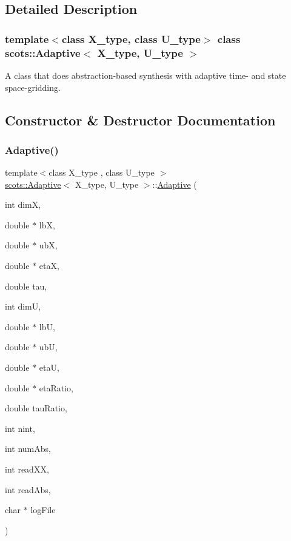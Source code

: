 \subsection{Detailed Description}
\subsubsection*{template$<$class X\+\_\+type, class U\+\_\+type$>$\newline
class scots\+::\+Adaptive$<$ X\+\_\+type, U\+\_\+type $>$}

A class that does abstraction-\/based synthesis with adaptive time-\/ and state space-\/gridding. 

\subsection{Constructor \& Destructor Documentation}
\mbox{\label{classscots_1_1Adaptive_a5665d4b8db7cc7c1e1ecba0a512959d7}} 
\subsubsection{\texorpdfstring{Adaptive()}{Adaptive()}}
{\footnotesize\ttfamily template$<$class X\+\_\+type , class U\+\_\+type $>$ \\
\hyperlink{classscots_1_1Adaptive}{scots\+::\+Adaptive}$<$ X\+\_\+type, U\+\_\+type $>$\+::\hyperlink{classscots_1_1Adaptive}{Adaptive} (\begin{DoxyParamCaption}\item[{int}]{dimX,  }\item[{double $\ast$}]{lbX,  }\item[{double $\ast$}]{ubX,  }\item[{double $\ast$}]{etaX,  }\item[{double}]{tau,  }\item[{int}]{dimU,  }\item[{double $\ast$}]{lbU,  }\item[{double $\ast$}]{ubU,  }\item[{double $\ast$}]{etaU,  }\item[{double $\ast$}]{eta\+Ratio,  }\item[{double}]{tau\+Ratio,  }\item[{int}]{nint,  }\item[{int}]{num\+Abs,  }\item[{int}]{read\+XX,  }\item[{int}]{read\+Abs,  }\item[{char $\ast$}]{log\+File }\end{DoxyParamCaption})\hspace{0.3cm}{\ttfamily [inline]}}

